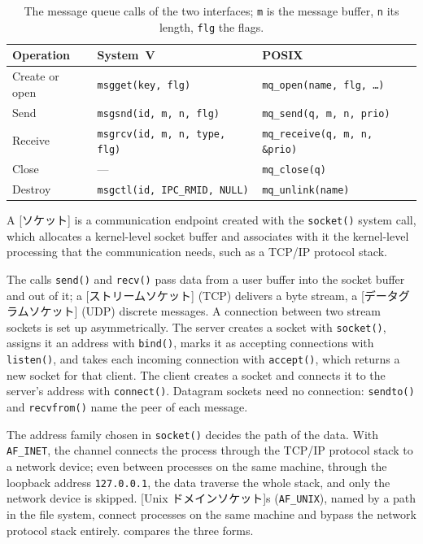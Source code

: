 \documentclass[../main.tex]{subfiles}
\begin{document}
\begin{table}[htbp]
  \centering
  \caption{The message queue calls of the two interfaces; \texttt{m} is the
    message buffer, \texttt{n} its length, \texttt{flg} the flags.}
  \label{tab:l09-mq-api}
  \small
  \setlength{\tabcolsep}{4pt}%
  \begin{tabular}{@{}lll@{}}
    \toprule
    Operation & System~V & POSIX \\
    \midrule
    Create or open & \texttt{msgget(key, flg)} & \texttt{mq\_open(name, flg, \ldots)} \\
    Send & \texttt{msgsnd(id, m, n, flg)} & \texttt{mq\_send(q, m, n, prio)} \\
    Receive & \texttt{msgrcv(id, m, n, type, flg)} & \texttt{mq\_receive(q, m, n, \&prio)} \\
    Close & --- & \texttt{mq\_close(q)} \\
    Destroy & \texttt{msgctl(id, IPC\_RMID, NULL)} & \texttt{mq\_unlink(name)} \\
    \bottomrule
  \end{tabular}
\end{table}

\begin{definition}[Socket]
  A [ソケット] is a communication endpoint created with the
  \texttt{socket()} system call, which allocates a kernel-level socket
  buffer and associates with it the kernel-level processing that the
  communication needs, such as a TCP/IP protocol stack.
\end{definition}

The calls \texttt{send()} and \texttt{recv()} pass data from a user buffer
into the socket buffer and out of it; a
[ストリームソケット] (TCP) delivers a byte stream, a
[データグラムソケット] (UDP) discrete messages.
A connection
between two stream sockets is set up asymmetrically.  The server creates a
socket with \texttt{socket()}, assigns it an address with \texttt{bind()},
marks it as accepting connections with \texttt{listen()}, and takes each
incoming connection with \texttt{accept()}, which returns a new socket for
that client.  The client creates a socket and connects it to the server's
address with \texttt{connect()}.  Datagram sockets need no connection:
\texttt{sendto()} and \texttt{recvfrom()} name the peer of each message.

The address family chosen in \texttt{socket()} decides the path of the
data.  With \texttt{AF\_INET}, the channel connects the process through the
TCP/IP protocol stack to a network device; even between processes on the
same machine, through the loopback address \texttt{127.0.0.1}, the data
traverse the whole stack, and only the network device is skipped.
[Unix ドメインソケット]s (\texttt{AF\_UNIX}), named
by a path in the file system, connect processes on the same machine and
bypass the network protocol stack entirely.   compares
the three forms.
\end{document}
